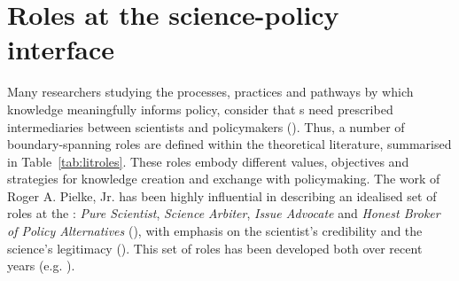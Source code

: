 \section{Roles at the science-policy interface}\label{sec:litroles}

Many researchers studying the processes, practices and pathways by which knowledge meaningfully informs policy, consider that \SPI s need prescribed intermediaries between scientists and policymakers (\cite{JagannathanEtAl2023}). Thus, a number of boundary-spanning roles are defined within the theoretical literature, summarised in Table~\ref{tab:litroles}. These roles embody different values, objectives and strategies for knowledge creation and exchange with policymaking. The work of Roger A. Pielke, Jr. has been highly influential in describing an idealised set of roles at the \SPI: \emph{Pure Scientist}, \emph{Science Arbiter}, \emph{Issue Advocate} and \emph{Honest Broker of Policy Alternatives} (\cite{Pielke2007}), with emphasis on the scientist's credibility and the science's legitimacy (\cite{DuncanRE2020}). This set of roles has been developed both over recent years (e.g. \cite{RapleyD2014,DuncanRE2020,GluckmanBK2021,GregoryBW2024}). %

